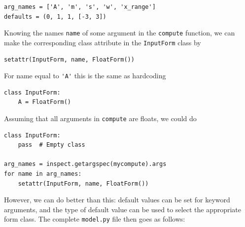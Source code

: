 \documentclass[%
oneside,                 %
final,                   %
10pt]{article}
\begin{document}
\begin{Verbatim}[numbers=none,fontsize=\fontsize{9pt}{9pt},baselinestretch=0.85]
arg_names = ['A', 'm', 's', 'w', 'x_range']
defaults = (0, 1, 1, [-3, 3])
\end{Verbatim}

Knowing the names \Verb!name! of some argument in the \Verb!compute!
function, we can make the corresponding class attribute
in the \Verb!InputForm! class by

\begin{Verbatim}[numbers=none,fontsize=\fontsize{9pt}{9pt},baselinestretch=0.85]
setattr(InputForm, name, FloatForm())
\end{Verbatim}
For name equal to \Verb!'A'! this is the same as hardcoding

\begin{Verbatim}[numbers=none,fontsize=\fontsize{9pt}{9pt},baselinestretch=0.85]
class InputForm:
    A = FloatForm()
\end{Verbatim}
Assuming that all arguments in \Verb!compute! are floats, we could
do

\begin{Verbatim}[numbers=none,fontsize=\fontsize{9pt}{9pt},baselinestretch=0.85]
class InputForm:
    pass  # Empty class

arg_names = inspect.getargspec(mycompute).args
for name in arg_names:
    setattr(InputForm, name, FloatForm())
\end{Verbatim}
However, we can do better than this: default values can be set for
keyword arguments, and the type of default value can be used to
select the appropriate form class. The complete \Verb!model.py! file
then goes as follows:
\end{document}
